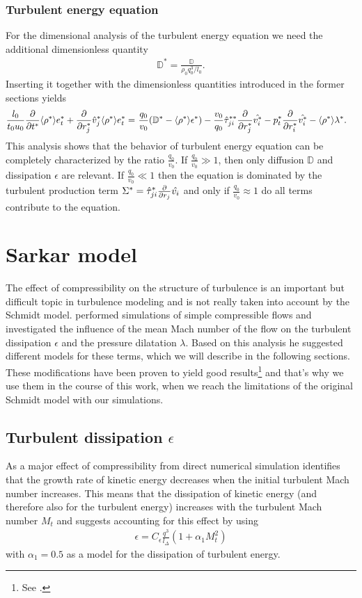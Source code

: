 \subsubsection{Turbulent energy equation}
For the dimensional analysis of the turbulent energy equation we need the
additional dimensionless quantity
\begin{align}
\mathbb{D}^* = \frac{\mathbb{D}}{\rho_0 q_0^3/l_0}. 
\end{align}
Inserting it together with the dimensionless quantities introduced in the
former sections yields
\begin{align}
\frac{l_0}{t_0 u_0}\frac{\partial}{\partial t^*}\langle \rho^* \rangle e_t^*
+\frac{\partial}{\partial r_j^*}\hat{v}_j^*\langle \rho^* \rangle e_t^*=&\
\frac{q_0}{v_0}{ \left( \mathbb{D}^*-\langle \rho^* \rangle\epsilon^* \right) }
-\frac{v_0}{q_0}\hat{\tau}^{**}_{ji}\frac{\partial}{\partial r_j^*}\hat{v_i^*}
-p_t^*\frac{\partial}{\partial r_i^*}\hat { v_i^* } - \langle \rho^* \rangle\lambda^*.
\end{align}
This analysis shows that the behavior of turbulent energy equation can be
completely characterized by the ratio $\frac{q_0}{v_0}$. If 
$\frac{q_0}{v_0} \gg 1$, then only diffusion $\mathbb{D}$ and dissipation
$\epsilon$ are relevant. If $\frac{q_0}{v_0} \ll 1$ then the equation is
dominated by the turbulent production term
$\Sigma^*=\hat{\tau}^{*}_{ji}\frac{\partial}{\partial r_j}\hat{v_i}$ and only if 
$\frac{q_0}{v_0} \approx 1$ do all terms contribute to the equation.

\section{Sarkar model}
The effect of compressibility on the structure of turbulence is an important
but difficult topic in turbulence modeling and is not really taken into account
by the Schmidt model. \citet{Sarkar1992} performed simulations of simple
compressible flows and investigated the influence of the mean Mach number of
the flow on the turbulent dissipation $\epsilon$ and the pressure dilatation
$\lambda$. Based on this analysis he suggested different models for these
terms, which we will describe in the following sections. These modifications
have been proven to yield good results\footnote{See \citet{Shyy1997}.} and
that's why we use them in the course of this work, when we reach the limitations
of the original Schmidt model with our simulations.
 
\subsection{Turbulent dissipation \texorpdfstring{$\epsilon$}{epsilon}}
As a major effect of compressibility from direct numerical simulation
\citet{Sarkar1992} identifies that the growth rate of kinetic energy decreases
when the initial turbulent Mach number increases. This means that the
dissipation of kinetic energy (and therefore also for the turbulent
energy) increases with the turbulent Mach number $M_t$ and
\citet{Sarkar1992} suggests accounting for this effect by using
\begin{align}
\epsilon=C_{\epsilon}\frac{q^3}{l_{\Delta}}(1+\alpha_1 M_t^2)
\end{align}
with $\alpha_1=0.5$ as a model for the dissipation of turbulent energy.

